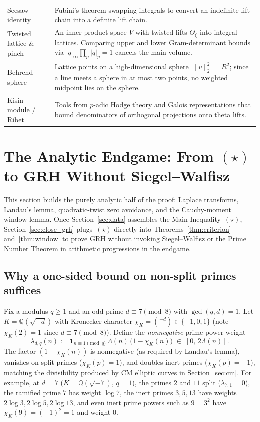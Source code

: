 \documentclass[11pt]{amsart}
\newcommand{\QQ}{\mathbb{Q}}
\theoremstyle{definition}
\theoremstyle{remark}
\begin{document}
\begin{table}[tbp]
\begin{tabular}{@{}>{\raggedright\arraybackslash}p{}>{\raggedright\arraybackslash}p{}@{}}
\addlinespace[2pt]
Seesaw identity & Fubini's theorem swapping integrals to convert an indefinite lift chain into a definite lift chain.\\
\addlinespace[2pt]
Twisted lattice \& pinch & An inner-product space $V$ with twisted lifts $\Theta_\xi$ into integral lattices. Comparing upper and lower Gram-determinant bounds via $|q|_\infty\prod_p|q|_p=1$ cancels the main volume.\\
\addlinespace[2pt]
Behrend sphere & Lattice points on a high-dimensional sphere $\|v\|_2^2=R^2$; since a line meets a sphere in at most two points, no weighted midpoint lies on the sphere.\\
\addlinespace[2pt]
Kisin module / Ribet & Tools from $p$-adic Hodge theory and Galois representations that bound denominators of orthogonal projections onto theta lifts.\\
\bottomrule
\end{tabular}
\end{table}

\section{The Analytic Endgame: From \texorpdfstring{$(\star)$}{(*)} to GRH Without Siegel--Walfisz}\label{sec:analytic}

This section builds the purely analytic half of the proof: Laplace transforms, Landau's lemma, quadratic-twist zero avoidance, and the Cauchy-moment window lemma. Once Section~\ref{sec:data} assembles the Main Inequality~$(\star)$, Section~\ref{sec:close_grh} plugs~$(\star)$ directly into Theorems~\ref{thm:criterion} and~\ref{thm:window} to prove GRH without invoking Siegel--Walfisz or the Prime Number Theorem in arithmetic progressions in the endgame.

\subsection{Why a one-sided bound on non-split primes suffices}
Fix a modulus $q\ge 1$ and an odd prime $d\equiv 7\pmod 8$ with $\gcd(q,d)=1$. Let $K=\QQ(\sqrt{-d})$ with Kronecker character $\chi_K=(\frac{-d}{\cdot})\in\{-1,0,1\}$ (note $\chi_K(2)=1$ since $d\equiv 7\pmod 8$). Define the \emph{nonnegative} prime-power weight
\begin{equation}\label{eq:lambda}
 \lambda_{d,q}(n) := \mathbf{1}_{n\equiv 1\pmod q}\,\Lambda(n)\,\bigl(1-\chi_K(n)\bigr) \;\in\; [0,\,2\Lambda(n)].
\end{equation}
The factor $(1-\chi_K(n))$ is nonnegative (as required by Landau's lemma), vanishes on split primes ($\chi_K(p)=1$), and doubles inert primes ($\chi_K(p)=-1$), matching the divisibility produced by CM elliptic curves in Section~\ref{sec:cm}. For example, at $d=7$ ($K=\QQ(\sqrt{-7})$, $q=1$), the primes $2$ and $11$ split ($\lambda_{7,1}=0$), the ramified prime $7$ has weight $\log 7$, the inert primes $3,5,13$ have weights $2\log 3,2\log 5,2\log 13$, and even inert prime powers such as $9=3^2$ have $\chi_K(9)=(-1)^2=1$ and weight $0$.
\end{document}
